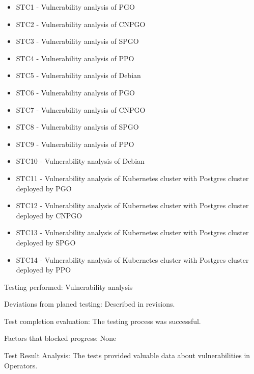 \begin{itemize}
    \item STC1 - Vulnerability analysis of PGO
    \item STC2 - Vulnerability analysis of CNPGO
    \item STC3 - Vulnerability analysis of SPGO
    \item STC4 - Vulnerability analysis of PPO
    \item STC5 - Vulnerability analysis of Debian
    \item STC6 - Vulnerability analysis of PGO
    \item STC7 - Vulnerability analysis of CNPGO
    \item STC8 - Vulnerability analysis of SPGO
    \item STC9 - Vulnerability analysis of PPO
    \item STC10 - Vulnerability analysis of Debian
    \item STC11 - Vulnerability analysis of Kubernetes cluster with Postgres cluster deployed by PGO
    \item STC12 - Vulnerability analysis of Kubernetes cluster with Postgres cluster deployed by CNPGO
    \item STC13 - Vulnerability analysis of Kubernetes cluster with Postgres cluster deployed by SPGO
    \item STC14 - Vulnerability analysis of Kubernetes cluster with Postgres cluster deployed by PPO
\end{itemize}

Testing performed: Vulnerability analysis

Deviations from planed testing: Described in revisions.

Test completion evaluation: The testing process was successful.

Factors that blocked progress: None

Test Result Analysis: The tests provided valuable data about vulnerabilities in Operators.


